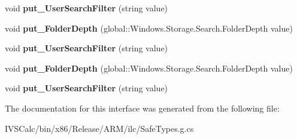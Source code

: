\begin{DoxyCompactItemize}
void {\bfseries put\+\_\+\+User\+Search\+Filter} (string value)
\item 
\mbox{\label{interface_windows_1_1_storage_1_1_search_1_1_i_query_options_a3737ff88fed7b38ed657d3a658354a4a}} 
void {\bfseries put\+\_\+\+Folder\+Depth} (global\+::\+Windows.\+Storage.\+Search.\+Folder\+Depth value)
\item 
\mbox{\label{interface_windows_1_1_storage_1_1_search_1_1_i_query_options_a447a6f5174a79844dd8edacd9616d879}} 
void {\bfseries put\+\_\+\+User\+Search\+Filter} (string value)
\item 
\mbox{\label{interface_windows_1_1_storage_1_1_search_1_1_i_query_options_a3737ff88fed7b38ed657d3a658354a4a}} 
void {\bfseries put\+\_\+\+Folder\+Depth} (global\+::\+Windows.\+Storage.\+Search.\+Folder\+Depth value)
\item 
\mbox{\label{interface_windows_1_1_storage_1_1_search_1_1_i_query_options_a447a6f5174a79844dd8edacd9616d879}} 
void {\bfseries put\+\_\+\+User\+Search\+Filter} (string value)
\end{DoxyCompactItemize}


The documentation for this interface was generated from the following file\+:\begin{DoxyCompactItemize}
\item 
I\+V\+S\+Calc/bin/x86/\+Release/\+A\+R\+M/ilc/Safe\+Types.\+g.\+cs\end{DoxyCompactItemize}

